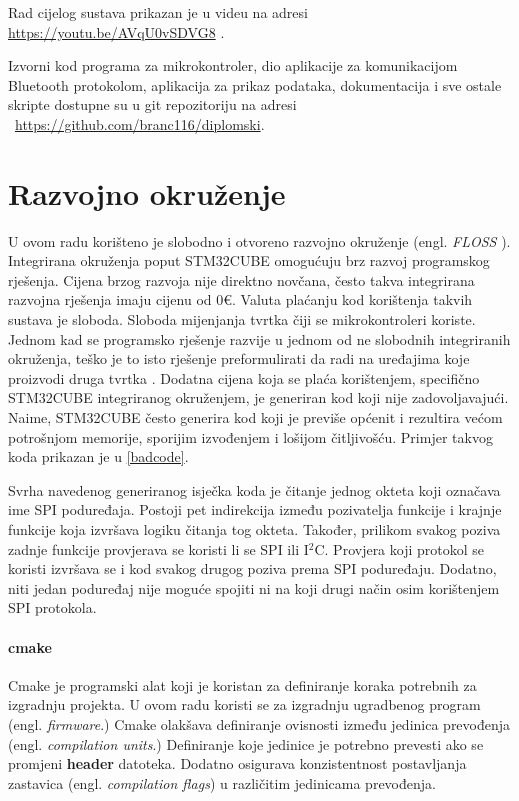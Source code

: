 \documentclass[times, utf8, diplomski]{diplomski}
\begin{document}
Rad cijelog sustava prikazan je u videu na adresi \url{https://youtu.be/AVqU0vSDVG8} \cite{videodemo}.

Izvorni kod programa za mikrokontroler, dio aplikacije za komunikacijom Bluetooth protokolom, aplikacija za prikaz podataka, dokumentacija i sve ostale skripte dostupne su u git repozitoriju na adresi \ \url{https://github.com/branc116/diplomski}.

\newpage

\chapter{Razvojno okruženje}
U ovom radu korišteno je slobodno i otvoreno razvojno okruženje (engl. \textit{FLOSS} \cite{FLOSS}). Integrirana okruženja poput STM32CUBE omogućuju brz razvoj programskog rješenja. Cijena brzog razvoja nije direktno novčana, često takva integrirana razvojna rješenja imaju cijenu od 0€. Valuta plaćanju kod korištenja takvih sustava je sloboda. Sloboda mijenjanja tvrtka čiji se mikrokontroleri koriste. Jednom kad se programsko rješenje razvije u jednom od ne slobodnih integriranih okruženja, teško je to isto rješenje preformulirati da radi na uređajima koje proizvodi druga tvrtka \cite{VENDORLOCKIN}. Dodatna cijena koja se plaća korištenjem, specifično STM32CUBE integriranog okruženjem, je generiran kod koji nije zadovoljavajući. Naime, STM32CUBE često generira kod koji je previše općenit i rezultira većom potrošnjom memorije, sporijim izvođenjem i lošijom čitljivošću. Primjer takvog koda prikazan je u \ref{badcode}.



Svrha navedenog generiranog isječka koda je čitanje jednog okteta koji označava ime SPI poduređaja. Postoji pet indirekcija između pozivatelja funkcije i krajnje funkcije koja izvršava logiku čitanja tog okteta. Također, prilikom svakog poziva zadnje funkcije provjerava se koristi li se SPI ili I\(^2\)C. Provjera koji protokol se koristi izvršava se i kod svakog drugog poziva prema SPI poduređaju. Dodatno, niti jedan poduređaj nije moguće spojiti ni na koji drugi način osim korištenjem SPI protokola.

\subsubsection{cmake}
Cmake je programski alat koji je koristan za definiranje koraka potrebnih za izgradnju projekta. U ovom radu koristi se za izgradnju ugradbenog program (engl. \textit{firmware}.) Cmake olakšava definiranje ovisnosti između jedinica prevođenja (engl. \textit{compilation units}.) Definiranje koje jedinice je potrebno prevesti ako se promjeni \textbf{header} datoteka. Dodatno osigurava konzistentnost postavljanja zastavica (engl. \textit{compilation flags}) u različitim jedinicama prevođenja.
\end{document}
